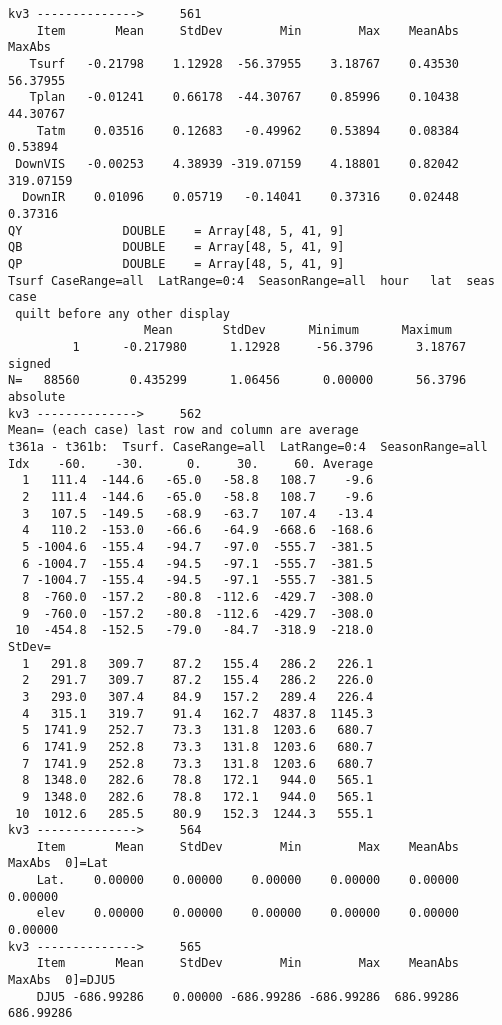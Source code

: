 \documentclass{article}
\begin{document}
\begin{verbatim}
kv3 -------------->     561
    Item       Mean     StdDev        Min        Max    MeanAbs     MaxAbs
   Tsurf   -0.21798    1.12928  -56.37955    3.18767    0.43530   56.37955
   Tplan   -0.01241    0.66178  -44.30767    0.85996    0.10438   44.30767
    Tatm    0.03516    0.12683   -0.49962    0.53894    0.08384    0.53894
 DownVIS   -0.00253    4.38939 -319.07159    4.18801    0.82042  319.07159
  DownIR    0.01096    0.05719   -0.14041    0.37316    0.02448    0.37316
QY              DOUBLE    = Array[48, 5, 41, 9]
QB              DOUBLE    = Array[48, 5, 41, 9]
QP              DOUBLE    = Array[48, 5, 41, 9]
Tsurf CaseRange=all  LatRange=0:4  SeasonRange=all  hour   lat  seas  case
 quilt before any other display
                   Mean       StdDev      Minimum      Maximum
         1      -0.217980      1.12928     -56.3796      3.18767  signed
N=   88560       0.435299      1.06456      0.00000      56.3796  absolute
kv3 -------------->     562
Mean= (each case) last row and column are average
t361a - t361b:  Tsurf. CaseRange=all  LatRange=0:4  SeasonRange=all
Idx    -60.    -30.      0.     30.     60. Average
  1   111.4  -144.6   -65.0   -58.8   108.7    -9.6
  2   111.4  -144.6   -65.0   -58.8   108.7    -9.6
  3   107.5  -149.5   -68.9   -63.7   107.4   -13.4
  4   110.2  -153.0   -66.6   -64.9  -668.6  -168.6
  5 -1004.6  -155.4   -94.7   -97.0  -555.7  -381.5
  6 -1004.7  -155.4   -94.5   -97.1  -555.7  -381.5
  7 -1004.7  -155.4   -94.5   -97.1  -555.7  -381.5
  8  -760.0  -157.2   -80.8  -112.6  -429.7  -308.0
  9  -760.0  -157.2   -80.8  -112.6  -429.7  -308.0
 10  -454.8  -152.5   -79.0   -84.7  -318.9  -218.0
StDev=
  1   291.8   309.7    87.2   155.4   286.2   226.1
  2   291.7   309.7    87.2   155.4   286.2   226.0
  3   293.0   307.4    84.9   157.2   289.4   226.4
  4   315.1   319.7    91.4   162.7  4837.8  1145.3
  5  1741.9   252.7    73.3   131.8  1203.6   680.7
  6  1741.9   252.8    73.3   131.8  1203.6   680.7
  7  1741.9   252.8    73.3   131.8  1203.6   680.7
  8  1348.0   282.6    78.8   172.1   944.0   565.1
  9  1348.0   282.6    78.8   172.1   944.0   565.1
 10  1012.6   285.5    80.9   152.3  1244.3   555.1
kv3 -------------->     564
    Item       Mean     StdDev        Min        Max    MeanAbs     MaxAbs  0]=Lat
    Lat.    0.00000    0.00000    0.00000    0.00000    0.00000    0.00000
    elev    0.00000    0.00000    0.00000    0.00000    0.00000    0.00000
kv3 -------------->     565
    Item       Mean     StdDev        Min        Max    MeanAbs     MaxAbs  0]=DJU5
    DJU5 -686.99286    0.00000 -686.99286 -686.99286  686.99286  686.99286




\end{verbatim}
\end{document}
